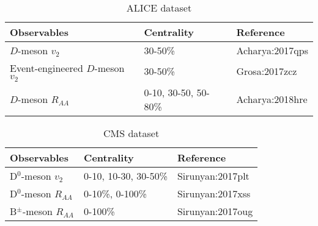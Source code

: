\begin{center}
\begin{table}[h]
\caption{ALICE dataset}\label{table:ALICE-obs} 
\begin{tabularx}{\columnwidth}{XXX}
\hline 
 Observables & Centrality & Reference\\ 
\hline 
$D$-meson $v_2$ & 30-50\% & {Acharya:2017qps}\\ 
\hline 
Event-engineered $D$-meson $v_2$ & 30-50\% & {Grosa:2017zcz}\\ 
\hline 
$D$-meson $R_{AA}$ & 0-10, 30-50, 50-80\% & {Acharya:2018hre}\\
\hline 
\end{tabularx}
\end{table}
\begin{table}[h]
\caption{CMS dataset}\label{table:CMS-obs} 
\begin{tabularx}{\columnwidth}{XXX}
\hline 
Observables & Centrality & Reference\\ 
\hline 
D${}^0$-meson $v_2$ & 0-10, 10-30, 30-50\% & {Sirunyan:2017plt}\\ 
\hline 
D${}^0$-meson $R_{AA}$ & 0-10\%, 0-100\% & {Sirunyan:2017xss}\\ 
\hline 
B${}^{\pm}$-meson $R_{AA}$ & 0-100\% & {Sirunyan:2017oug}\\ 
\hline 
\end{tabularx}
\end{table}
\end{center}

